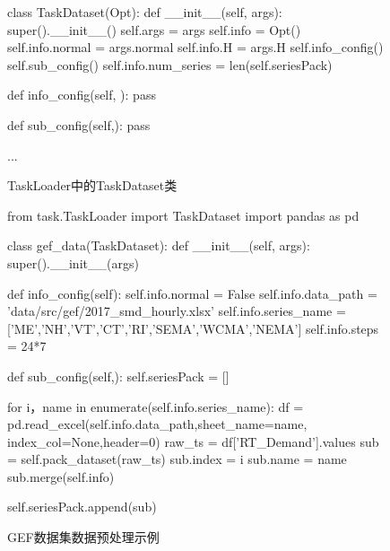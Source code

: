 
\begin{figure}[t!]
    \begin{python}
        class TaskDataset(Opt):
            def __init__(self, args):
                super().__init__()
                self.args = args
                self.info = Opt()
                self.info.normal = args.normal
                self.info.H = args.H
                self.info_config()
                self.sub_config()
                self.info.num_series = len(self.seriesPack)                    
            
            def info_config(self, ):
                pass
            
            def sub_config(self,):
                pass
            
            ...
    \end{python}
    \caption{TaskLoader中的TaskDataset类\label{fig:ch.univ.data} }
\end{figure}

\begin{figure}[t!]
    \begin{python}
        from task.TaskLoader import TaskDataset
        import pandas as pd

        class gef_data(TaskDataset):
            def __init__(self, args):
                super().__init__(args)
                
            
            def info_config(self):
                self.info.normal = False
                self.info.data_path = 'data/src/gef/2017_smd_hourly.xlsx'
                self.info.series_name = ['ME','NH','VT','CT','RI','SEMA','WCMA','NEMA']
                self.info.steps = 24*7

            def sub_config(self,):
                self.seriesPack = []
                
                for i，name in enumerate(self.info.series_name):
                    df = pd.read_excel(self.info.data_path,sheet_name=name, index_col=None,header=0)
                    raw_ts = df['RT_Demand'].values
                    sub = self.pack_dataset(raw_ts)
                    sub.index = i
                    sub.name = name
                    sub.merge(self.info)            

                    self.seriesPack.append(sub)
    \end{python}
    \caption{GEF数据集数据预处理示例\label{fig:ch.univ.gef} }
\end{figure}